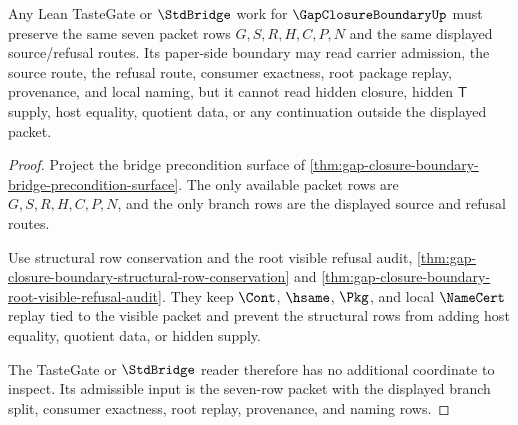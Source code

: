 \begin{theorem}
\label{thm:gap-closure-boundary-tastegate-boundary}
Any Lean TasteGate or $\StdBridge$ work for $\GapClosureBoundaryUp$ must preserve the same seven packet rows $G,S,R,H,C,P,N$ and the same displayed source/refusal routes. Its paper-side boundary may read carrier admission, the source route, the refusal route, consumer exactness, root package replay, provenance, and local naming, but it cannot read hidden closure, hidden $\mathsf{T}$ supply, host equality, quotient data, or any continuation outside the displayed packet.
\end{theorem}
\begin{proof}
Project the bridge precondition surface of \autoref{thm:gap-closure-boundary-bridge-precondition-surface}. The only available packet rows are $G,S,R,H,C,P,N$, and the only branch rows are the displayed source and refusal routes.

Use structural row conservation and the root visible refusal audit, \autoref{thm:gap-closure-boundary-structural-row-conservation} and \autoref{thm:gap-closure-boundary-root-visible-refusal-audit}. They keep $\Cont$, $\hsame$, $\Pkg$, and local $\NameCert$ replay tied to the visible packet and prevent the structural rows from adding host equality, quotient data, or hidden supply.

The TasteGate or $\StdBridge$ reader therefore has no additional coordinate to inspect. Its admissible input is the seven-row packet with the displayed branch split, consumer exactness, root replay, provenance, and naming rows.
\end{proof}

